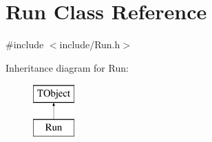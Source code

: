 \hypertarget{classRun}{}\section{Run Class Reference}
\label{classRun}


{\ttfamily \#include $<$include/\+Run.\+h$>$}

Inheritance diagram for Run\+:\begin{figure}[H]
\begin{center}
\leavevmode
\includegraphics[height=2.000000cm]{classRun}
\end{center}
\end{figure}
